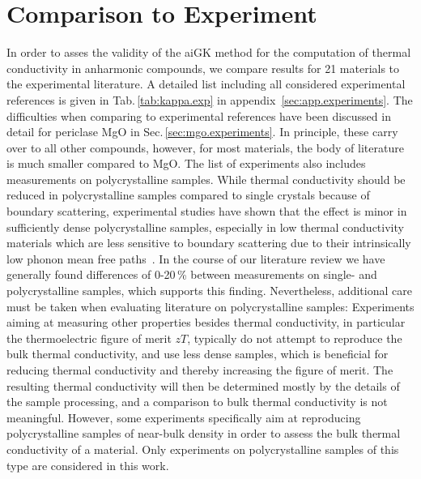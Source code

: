 \section{Comparison to Experiment}
\label{sec:results.experiments}
In order to asses the validity of the aiGK method for the computation of thermal conductivity in anharmonic compounds, we compare results for 21 materials to the experimental literature. A detailed list including all considered experimental references is given in Tab.\,\ref{tab:kappa.exp} in appendix~\ref{sec:app.experiments}. The difficulties when comparing to experimental references have been discussed in detail for periclase MgO in Sec.\,\ref{sec:mgo.experiments}. In principle, these carry over to all other compounds, however, for most materials, the body of literature is much smaller compared to MgO. The list of experiments also includes measurements on polycrystalline samples. While thermal conductivity should be reduced in polycrystalline samples compared to single crystals because of boundary scattering, experimental studies have shown that the effect is minor in sufficiently dense polycrystalline samples, especially in low thermal conductivity materials which are less sensitive to boundary scattering due to their intrinsically low phonon mean free paths~\cite{Charvat.1957}. In the course of our literature review we have generally found differences of 0-20\,\% between measurements on single- and polycrystalline samples, which supports this finding. Nevertheless, additional care must be taken when evaluating literature on polycrystalline samples: Experiments aiming at measuring other properties besides thermal conductivity, in particular the thermoelectric figure of merit $zT$, typically do not attempt to reproduce the bulk thermal conductivity, and use less dense samples, which is beneficial for reducing thermal conductivity and thereby increasing the figure of merit. The resulting thermal conductivity will then be determined mostly by the details of the sample processing, 
and a comparison to bulk thermal conductivity is not meaningful. However, some experiments specifically aim at reproducing polycrystalline samples of near-bulk density in order to assess the bulk thermal conductivity of a material. Only experiments on polycrystalline samples of this type are considered in this work.

